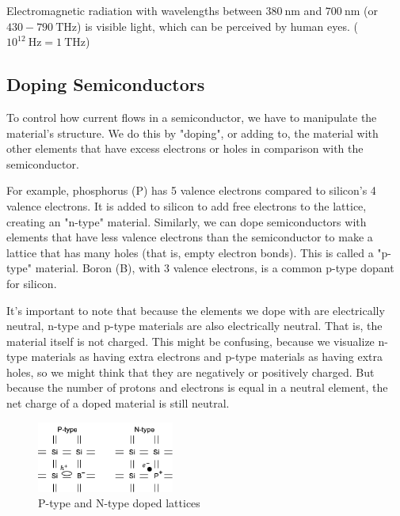 Electromagnetic radiation with wavelengths between $380 ~\si{\nano\meter}$ and $700 ~\si{\nano\meter}$ (or $430-790 ~\si{\tera\hertz}$) is visible light, which can be perceived by human eyes. ($10^{12}~\si{\hertz} = 1~\si{\tera\hertz}$)

\subsection{Doping Semiconductors}

To control how current flows in a semiconductor, we have to manipulate the material's structure. We do this by "doping", or adding to, the material with other elements that have excess electrons or holes in comparison with the semiconductor.

For example, phosphorus (P) has 5 valence electrons compared to silicon's 4 valence electrons. It is added to silicon to add free electrons to the lattice, creating an "n-type" material. Similarly, we can dope semiconductors with elements that have less valence electrons than the semiconductor to make a lattice that has many holes (that is, empty electron bonds). This is called a "p-type" material. Boron (B), with 3 valence electrons, is a common p-type dopant for silicon.

It's important to note that because the elements we dope with are electrically neutral, n-type and p-type materials are also electrically neutral. That is, the material itself is not charged. This might be confusing, because we visualize n-type materials as having extra electrons and p-type materials as having extra holes, so we might think that they are negatively or positively charged. But because the number of protons and electrons is equal in a neutral element, the net charge of a doped material is still neutral. 

	\begin{figure}[H]{
		\centering
		\includegraphics[width=0.4\textwidth]{n_led/doped_lattice.png}
		\caption{P-type and N-type doped lattices}
		\vspace{-5mm}}
	\label{fig:DopedSi}
\end{figure}

